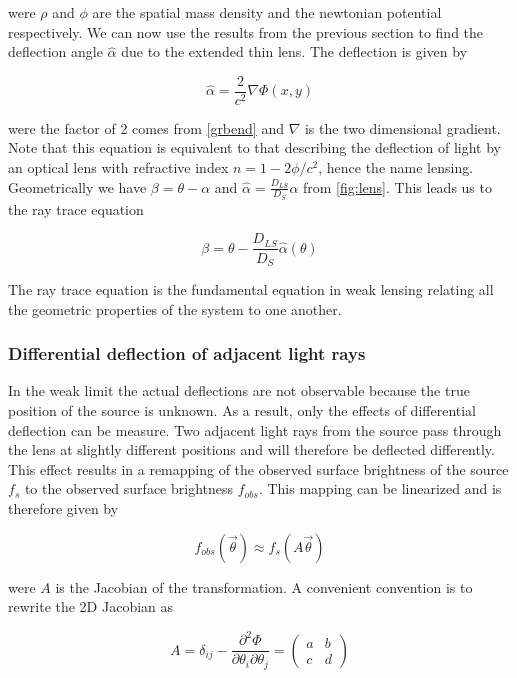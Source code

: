 were $\rho$ and $\phi$ are the spatial mass density and the newtonian potential respectively. We can now use the results from the previous section to find the deflection angle $\hat{\alpha}$ due to the extended thin lens. The deflection is given by

\begin{equation}
  \hat{\alpha} = \frac{2}{c^2} \nabla \Phi(x,y)
  \label{eq:deflectionthinlens}
\end{equation}

were the factor of 2 comes from \autoref{grbend} and $\nabla$ is the two dimensional gradient. Note that this equation is equivalent to that describing the deflection of light by an optical lens with refractive index $n=1-2\phi/c^2$, hence the name lensing. Geometrically we have $\beta = \theta - \alpha$ and $\hat{\alpha} = \frac{D_{LS}}{D_S}\alpha$ from \autoref{fig:lens}. This leads us to the ray trace equation

\begin{equation}
  \beta = \theta - \frac{D_{LS}}{D_S} \hat{\alpha}(\theta)
  \label{eq:raytrace}
\end{equation}

The ray trace equation is the fundamental equation in weak lensing relating all the geometric properties of the system to one another. 

\subsubsection{Differential deflection of adjacent light rays}
In the weak limit the actual deflections are not observable because the true position of the source is unknown. As a result, only the effects of differential deflection can be measure. Two adjacent light rays from the source pass through the lens at slightly different positions and will therefore be deflected differently. This effect results in a remapping of the observed surface brightness of the source $f_s$ to the observed surface brightness $f_{obs}$. This mapping can be linearized and is therefore given by 

\begin{equation}
  f_{obs}(\vec{\theta}) \approx f_s(A\vec{\theta})
  \label{eq:linearizedbright}
\end{equation}

were $A$ is the Jacobian of the transformation. A convenient convention is to rewrite the 2D Jacobian as 

\begin{equation}
  A = \delta_{ij} - \frac{\partial^2 \Phi}{\partial \theta_i \partial \theta_j} =  \begin{pmatrix}
    a & b \\
    c & d
    \end{pmatrix}
  \label{eq:Ajacobian}
\end{equation}


